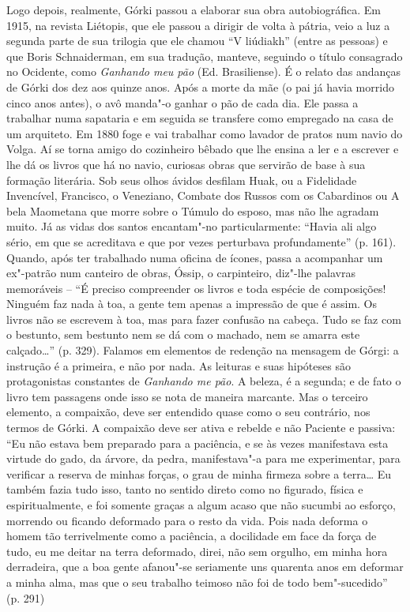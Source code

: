 Logo depois, realmente, Górki passou a elaborar sua obra autobiográfica.
Em 1915, na revista Liétopis, que ele passou a dirigir de volta à
pátria, veio a luz a segunda parte de sua trilogia que ele chamou ``V
liúdiakh'' (entre as pessoas) e que Boris Schnaiderman, em sua tradução,
manteve, seguindo o título consagrado no Ocidente, como \emph{Ganhando
meu pão} (Ed. Brasiliense). É o relato das andanças de Górki dos dez aos
quinze anos. Após a morte da mãe (o pai já havia morrido cinco anos
antes), o avô manda"-o ganhar o pão de cada dia. Ele passa a trabalhar
numa sapataria e em seguida se transfere como empregado na casa de um
arquiteto. Em 1880 foge e vai trabalhar como lavador de pratos num navio
do Volga. Aí se torna amigo do cozinheiro bêbado que lhe ensina a ler e
a escrever e lhe dá os livros que há no navio, curiosas obras que
servirão de base à sua formação literária. Sob seus olhos ávidos
desfilam Huak, ou a Fidelidade Invencível, Francisco, o Veneziano,
Combate dos Russos com os Cabardinos ou A bela Maometana que morre sobre
o Túmulo do esposo, mas não lhe agradam muito. Já as vidas dos santos
encantam"-no particularmente: ``Havia ali algo sério, em que se
acreditava e que por vezes perturbava profundamente'' (p. 161). Quando,
após ter trabalhado numa oficina de ícones, passa a acompanhar um
ex"-patrão num canteiro de obras, Óssip, o carpinteiro, diz"-lhe palavras
memoráveis -- ``É preciso compreender os livros e toda espécie de
composições! Ninguém faz nada à toa, a gente tem apenas a impressão de
que é assim. Os livros não se escrevem à toa, mas para fazer confusão na
cabeça. Tudo se faz com o bestunto, sem bestunto nem se dá com o
machado, nem se amarra este calçado\ldots{}'' (p. 329). Falamos em elementos
de redenção na mensagem de Górgi: a instrução é a primeira, e não por
nada. As leituras e suas hipóteses são protagonistas constantes de
\emph{Ganhando me pão}. A beleza, é a segunda; e de fato o livro tem
passagens onde isso se nota de maneira marcante. Mas o terceiro
elemento, a compaixão, deve ser entendido quase como o seu contrário,
nos termos de Górki. A compaixão deve ser ativa e rebelde e não Paciente
e passiva: ``Eu não estava bem preparado para a paciência, e se às vezes
manifestava esta virtude do gado, da árvore, da pedra, manifestava"-a
para me experimentar, para verificar a reserva de minhas forças, o grau
de minha firmeza sobre a terra\ldots{} Eu também fazia tudo isso, tanto no
sentido direto como no figurado, física e espiritualmente, e foi somente
graças a algum acaso que não sucumbi ao esforço, morrendo ou ficando
deformado para o resto da vida. Pois nada deforma o homem tão
terrivelmente como a paciência, a docilidade em face da força de tudo,
eu me deitar na terra deformado, direi, não sem orgulho, em minha hora
derradeira, que a boa gente afanou"-se seriamente uns quarenta anos em
deformar a minha alma, mas que o seu trabalho teimoso não foi de todo
bem"-sucedido'' (p. 291)

